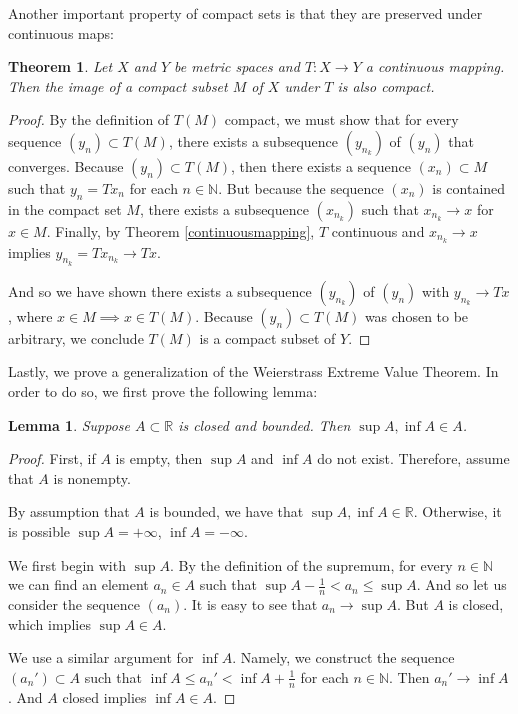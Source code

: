 \documentclass[11pt]{article}
\theoremstyle{mystyle}
\newtheorem{thm}{Theorem}[section]
\newtheorem{lm}{Lemma}[section]
\newcommand{\0}{\mathbf{0}}
\begin{document}
Another important property of compact sets is that they are preserved under continuous maps:
\begin{thm}\label{continuouscompact}
Let $X$ and $Y$ be metric spaces and $T: X \longrightarrow Y$ a continuous mapping. Then the image of a compact subset $M$ of $X$ under $T$ is also compact.
\end{thm}
\begin{proof}
By the definition of $T(M)$ compact, we must show that for every sequence $(y_n) \subset T(M)$, there exists a subsequence $(y_{n_k})$ of $(y_n)$ that converges. Because $(y_n) \subset T(M)$, then there exists a sequence $(x_n) \subset M$ such that $y_n = Tx_n$ for each $n \in \mathbb{N}$. But because the sequence $(x_n)$ is contained in the compact set $M$, there exists a subsequence $(x_{n_k})$ such that $x_{n_k} \longrightarrow x$ for $x \in M$. Finally, by Theorem \ref{continuousmapping}, $T$ continuous and $x_{n_k} \longrightarrow x$ implies $y_{n_k} = Tx_{n_k} \longrightarrow Tx$. 

And so we have shown there exists a subsequence $(y_{n_k})$ of $(y_n)$ with $y_{n_k} \longrightarrow Tx$, where $x \in M \implies x \in T(M)$. Because $(y_n) \subset T(M)$ was chosen to be arbitrary, we conclude $T(M)$ is a compact subset of $Y$.
\end{proof}

Lastly, we prove a generalization of the Weierstrass Extreme Value Theorem. In order to do so, we first prove the following lemma:
\begin{lm}\label{infsup}
Suppose $A \subset \mathbb{R}$ is closed and bounded. Then $\sup A, \inf A  \in A$.
\end{lm}
\begin{proof}
First, if $A$ is empty, then $\sup A$ and $\inf A$ do not exist. Therefore, assume that $A$ is nonempty.

By assumption that $A$ is bounded, we have that $\sup A, \inf A \in \mathbb{R}$. Otherwise, it is possible $\sup A = +\infty$, $\inf A = -\infty$.

We first begin with $\sup A$. By the definition of the supremum, for every $n \in \mathbb{N}$ we can find an element $a_n \in A$ such that $\sup A - \frac{1}{n} < a_n \leq \sup A$. And so let us consider the sequence $(a_n)$. It is easy to see that $a_n \longrightarrow \sup A$. But $A$ is closed, which implies $\sup A \in A$.

We use a similar argument for $\inf A$. Namely, we construct the sequence $(a_n') \subset A$ such that $\inf A \leq a_n' < \inf A + \frac{1}{n}$ for each $n \in \mathbb{N}$. Then $a_n' \longrightarrow \inf A$. And $A$ closed implies $\inf A \in A$.
\end{proof}
\end{document}
